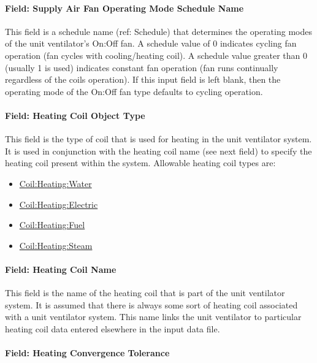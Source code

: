 \paragraph{Field: Supply Air Fan Operating Mode Schedule Name}\label{field-supply-air-fan-operating-mode-schedule-name-1-000}

This field is a schedule name (ref: Schedule) that determines the operating modes of the unit ventilator's On:Off fan. A schedule value of 0 indicates cycling fan operation (fan cycles with cooling/heating coil). A schedule value greater than 0 (usually 1 is used) indicates constant fan operation (fan runs continually regardless of the coils operation). If this input field is left blank, then the operating mode of the On:Off fan type defaults to cycling operation.

\paragraph{Field: Heating Coil Object Type}\label{field-heating-coil-object-type-1-001}

This field is the type of coil that is used for heating in the unit ventilator system. It is used in conjunction with the heating coil name (see next field) to specify the heating coil present within the system. Allowable heating coil types are:

\begin{itemize}
\item
  \hyperref[coilheatingwater]{Coil:Heating:Water}
\item
  \hyperref[coilheatingelectric]{Coil:Heating:Electric}
\item
  \hyperref[coilheatinggas-000]{Coil:Heating:Fuel}
\item
  \hyperref[coilheatingsteam]{Coil:Heating:Steam}
\end{itemize}

\paragraph{Field: Heating Coil Name}\label{field-heating-coil-name-1-001}

This field is the name of the heating coil that is part of the unit ventilator system. It is assumed that there is always some sort of heating coil associated with a unit ventilator system. This name links the unit ventilator to particular heating coil data entered elsewhere in the input data file.

\paragraph{Field: Heating Convergence Tolerance}\label{field-heating-convergence-tolerance-1}

